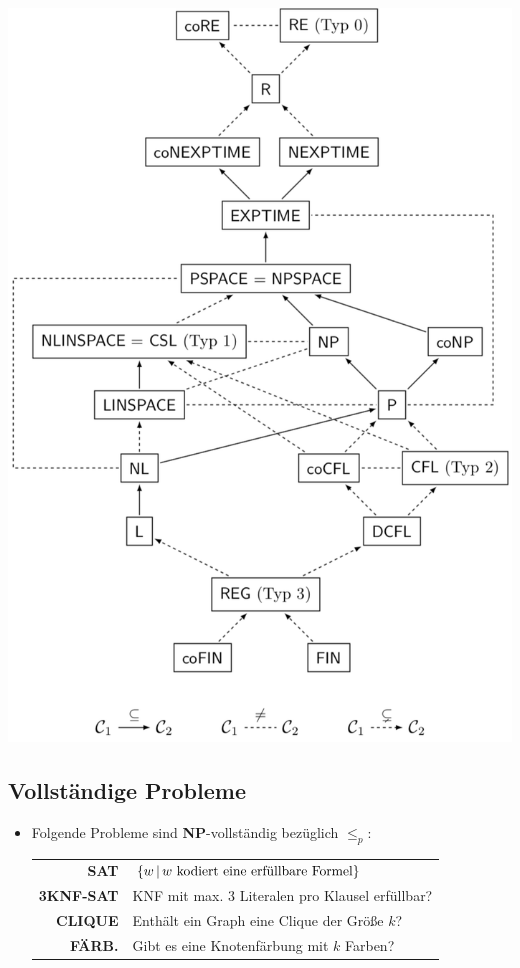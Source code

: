 \documentclass[landscape, 8pt, a4paper]{extarticle}
\newcommand{\npoly}{\textbf{NP}}
\newcommand{\set}[2]{\ensuremath\left\{ #1 \,\middle|\, #2 \right\}}
\begin{document}
\begin{multicols}{3}
	\includegraphics[width=\columnwidth]{graph.png}


	\subsection{Vollständige Probleme}
	\begin{itemize}
		\item Folgende Probleme sind \npoly-vollständig bezüglich $\leq_p$:
		\begin{tabular}{r|l}
			\textbf{SAT} & $\set{w}{w\text{ kodiert eine erfüllbare Formel}}$\\
			\textbf{3KNF-SAT} & KNF mit max. 3 Literalen pro Klausel erfüllbar?\\
			\textbf{CLIQUE} & Enthält ein Graph eine Clique der Größe $k$?\\
			\textbf{FÄRB.} & Gibt es eine Knotenfärbung mit $k$ Farben?\\
		\end{tabular}


\end{itemize}
\end{multicols}
\end{document}
